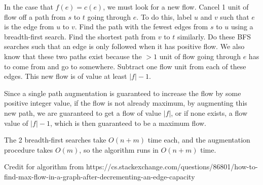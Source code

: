 \documentclass{article}
\begin{document}
In the case that $f(e) = c(e)$, we must look for a new flow. Cancel 1 unit of flow
off a path from $s$ to $t$ going through $e$. To do this, label $u$ and $v$
such that $e$ is the edge from $u$ to $v$. Find the path with
the fewest edges from $s$ to $u$ using a breadth-first search. Find the
shortest path from $v$ to $t$ similarly. Do these BFS searches such that an
edge is only followed when it has positive flow. We also know that these two
paths exist because the $> 1$ unit of flow going through $e$ has to come from
and go to somewhere. Subtract one flow unit from each of these edges. This new
flow is of value at least $|f| - 1$.

Since a single path augmentation is guaranteed to increase the flow by some
positive integer value, if the flow is not already maximum, by augmenting this
new path, we are guaranteed to get a flow of value $|f|$, or if none exists, a
flow value of $|f| - 1$, which is then guaranteed to be a maximum flow.

The 2 breadth-first searches take $O(n+m)$ time each, and the augmentation
procedure takes $O(m)$, so the algorithm runs in $O(n+m)$ time.

Credit for algorithm from 
https://cs.stackexchange.com/questions/86801/how-to-find-max-flow-in-a-graph-after-decrementing-an-edge-capacity
\end{document}
